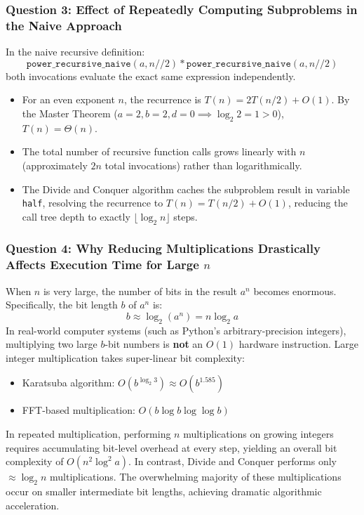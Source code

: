 \documentclass[12pt]{article}
\begin{document}
\subsubsection{Question 3: Effect of Repeatedly Computing Subproblems in the Naive Approach}
In the naive recursive definition:
\begin{equation*}
    \texttt{power\_recursive\_naive}(a, n//2) * \texttt{power\_recursive\_naive}(a, n//2)
\end{equation*}
both invocations evaluate the exact same expression independently. 
\begin{itemize}
    \item For an even exponent $n$, the recurrence is $T(n) = 2T(n/2) + O(1)$. By the Master Theorem ($a=2, b=2, d=0 \implies \log_2 2 = 1 > 0$), $T(n) = \Theta(n)$.
    \item The total number of recursive function calls grows linearly with $n$ (approximately $2n$ total invocations) rather than logarithmically.
    \item The Divide and Conquer algorithm caches the subproblem result in variable \texttt{half}, resolving the recurrence to $T(n) = T(n/2) + O(1)$, reducing the call tree depth to exactly $\lfloor \log_2 n \rfloor$ steps.
\end{itemize}

\subsubsection{Question 4: Why Reducing Multiplications Drastically Affects Execution Time for Large $n$}
When $n$ is very large, the number of bits in the result $a^n$ becomes enormous. Specifically, the bit length $b$ of $a^n$ is:
\begin{equation}
    b \approx \log_2(a^n) = n \log_2 a
\end{equation}
In real-world computer systems (such as Python's arbitrary-precision integers), multiplying two large $b$-bit numbers is \textbf{not} an $O(1)$ hardware instruction. Large integer multiplication takes super-linear bit complexity:
\begin{itemize}
    \item Karatsuba algorithm: $O(b^{\log_2 3}) \approx O(b^{1.585})$
    \item FFT-based multiplication: $O(b \log b \log \log b)$
\end{itemize}
In repeated multiplication, performing $n$ multiplications on growing integers requires accumulating bit-level overhead at every step, yielding an overall bit complexity of $O(n^2 \log^2 a)$. In contrast, Divide and Conquer performs only $\approx \log_2 n$ multiplications. The overwhelming majority of these multiplications occur on smaller intermediate bit lengths, achieving dramatic algorithmic acceleration.
\end{document}

